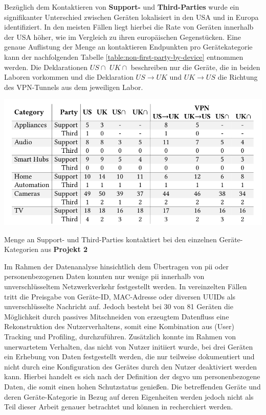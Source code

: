 \noindent Bezüglich dem Kontaktieren von \textbf{Support-} und \textbf{Third-Parties} wurde ein signifikanter Unterschied zwischen Geräten lokalisiert in den USA und in Europa identifiziert. In den meisten Fällen liegt hierbei die Rate von Geräten innerhalb der USA höher, wie im Vergleich zu ihren europäischen Gegenstücken. Eine genaue Auflistung der Menge an kontaktieren Endpunkten pro Gerätekategorie kann der nachfolgenden Tabelle \ref{table:non-first-party-by-device} entnommen werden. Die Deklarationen $US\cap$ $UK\cap$ beschreiben nur die Geräte, die in beiden Laboren vorkommen und die Deklaration $US \rightarrow UK$ und $UK \rightarrow US$ die Richtung des VPN-Tunnels aus dem jeweiligen Labor.

\begin{table}
    \includegraphics[width=\textwidth]{main/pictures/projekt_two/Non_First_Party_By_Category}
    \caption{Menge an Support- und Third-Parties kontaktiert bei den einzelnen Geräte-Kategorien aus \textbf{Projekt 2} \cite{Ren2019}}
    \label{table:non-first-party-by-device}
\end{table}

\noindent Im Rahmen der Datenanalyse hinsichtlich dem Übertragen von \ac{pii} oder personenbezogenen Daten konnten nur wenige \ac{pii} innerhalb von unverschlüsseltem Netzwerkverkehr festgestellt werden. In vereinzelten Fällen tritt die Preisgabe von Geräte-ID, MAC-Adresse oder diversen UUIDs als unverschlüsselte Nachricht auf. Jedoch besteht bei 30 von 81 Geräten die Möglichkeit durch passives Mitschneiden von erzeugtem Datenfluss eine Rekonstruktion des Nutzerverhaltens, somit eine Kombination aus (User) Tracking und Profiling, durchzuführen. Zusätzlich konnte im Rahmen von unerwartetem Verhalten, das nicht von Nutzer initiiert wurde, bei drei Geräten ein Erhebung von Daten festgestellt werden, die nur teilweise dokumentiert und nicht durch eine Konfiguration des Gerätes durch den Nutzer deaktiviert werden kann. Hierbei handelt es sich nach der Definition der \ac{dsgvo} um personenbezogene Daten, die somit einen hohen Schutzstatus genießen. Die betreffenden Geräte und deren Geräte-Kategorie in Bezug auf deren Eigenheiten werden jedoch nicht als Teil dieser Arbeit genauer betrachtet und können in \cite{Ren2019} recherchiert werden.

